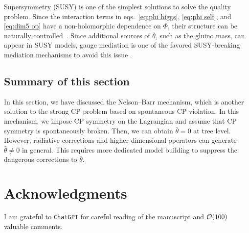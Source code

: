 \documentclass[11pt,a4paper]{article}
\begin{document}
Supersymmetry (SUSY) is one of the simplest solutions to solve the quality problem. Since the interaction terms in eqs.~\eqref{eq:phi higgs}, \eqref{eq:phi self}, and \eqref{eq:dim5 op} have a non-holomorphic dependence on $\Phi$, their structure can be naturally controlled~\cite{Dine:1993qm}.
Since additional sources of $\bar\theta$, such as the gluino mass, can appear in SUSY models, gauge mediation is one of the favored SUSY-breaking mediation mechanisms to avoid this issue \cite{Hiller:2001qg, Dine:2015jga, Evans:2020vil, Fujikura:2022sot}.


\subsection{Summary of this section}
In this section, we have discussed the Nelson--Barr mechanism, which is another solution to the strong CP problem based on spontaneous CP violation. In this mechanism, we impose CP symmetry on the Lagrangian and assume that CP symmetry is spontaneously broken. Then, we can obtain $\bar\theta = 0$ at tree level. However, radiative corrections and higher dimensional operators can generate $\bar\theta \neq 0$ in general. This requires more dedicated model building to suppress the dangerous corrections to $\bar\theta$.

\section*{Acknowledgments}
I am grateful to \texttt{ChatGPT} for careful reading of the manuscript and ${\cal O}(100)$ valuable comments.

\appendix
\end{document}
